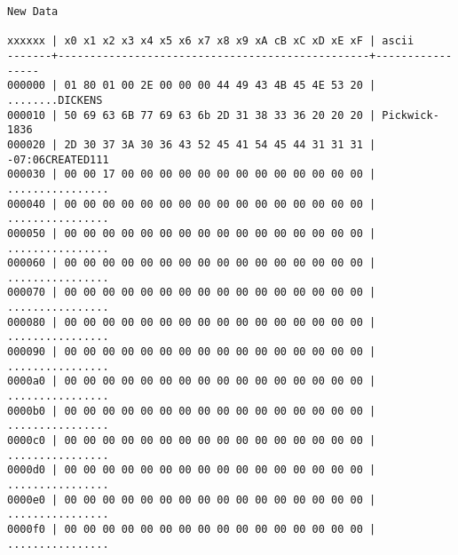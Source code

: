 \begin{screendump}
  \begin{verbatim}
New Data

xxxxxx | x0 x1 x2 x3 x4 x5 x6 x7 x8 x9 xA cB xC xD xE xF | ascii
-------+-------------------------------------------------+-----------------
000000 | 01 80 01 00 2E 00 00 00 44 49 43 4B 45 4E 53 20 | ........DICKENS
000010 | 50 69 63 6B 77 69 63 6b 2D 31 38 33 36 20 20 20 | Pickwick-1836
000020 | 2D 30 37 3A 30 36 43 52 45 41 54 45 44 31 31 31 | -07:06CREATED111
000030 | 00 00 17 00 00 00 00 00 00 00 00 00 00 00 00 00 | ................
000040 | 00 00 00 00 00 00 00 00 00 00 00 00 00 00 00 00 | ................
000050 | 00 00 00 00 00 00 00 00 00 00 00 00 00 00 00 00 | ................
000060 | 00 00 00 00 00 00 00 00 00 00 00 00 00 00 00 00 | ................
000070 | 00 00 00 00 00 00 00 00 00 00 00 00 00 00 00 00 | ................
000080 | 00 00 00 00 00 00 00 00 00 00 00 00 00 00 00 00 | ................
000090 | 00 00 00 00 00 00 00 00 00 00 00 00 00 00 00 00 | ................
0000a0 | 00 00 00 00 00 00 00 00 00 00 00 00 00 00 00 00 | ................
0000b0 | 00 00 00 00 00 00 00 00 00 00 00 00 00 00 00 00 | ................
0000c0 | 00 00 00 00 00 00 00 00 00 00 00 00 00 00 00 00 | ................
0000d0 | 00 00 00 00 00 00 00 00 00 00 00 00 00 00 00 00 | ................
0000e0 | 00 00 00 00 00 00 00 00 00 00 00 00 00 00 00 00 | ................
0000f0 | 00 00 00 00 00 00 00 00 00 00 00 00 00 00 00 00 | ................
  \end{verbatim}
\end{screendump}
